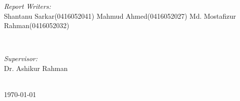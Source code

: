 \begin{titlepage}
\begin{minipage}{0.5\textwidth}
\begin{flushleft} \large
\emph{Report Writers:}\\
Shantanu Sarkar\newline(0416052041) \newline %
Mahmud Ahmed\newline(0416052027) \newline
Md. Mostafizur Rahman\newline(0416052032) 
\end{flushleft}
\end{minipage}
~
\begin{minipage}{0.4\textwidth}
\begin{flushright} \large
\emph{Supervisor:} \\
Dr. Ashikur  Rahman%
\end{flushright}
\end{minipage}\\[1cm]





{\large \today}\\[.5cm] %



 

\vfill %

\end{titlepage}

\tableofcontents

